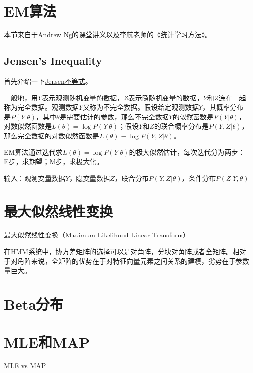 \section{EM算法}
\label{sec:em}
本节来自于Andrew Ng的课堂讲义以及李航老师的《统计学习方法》。

\subsection{Jensen's Inequality}
首先介绍一下\href{https://en.wikipedia.org/wiki/Jensen\%27s_inequality}{Jensen不等式}。



一般地，用$Y$表示观测随机变量的数据，$Z$表示隐随机变量的数据，$Y$和$Z$连在一起称为完全数据。观测数据$Y$又称为不完全数据。假设给定观测数据$Y$，其概率分布是$P(Y|\theta)$，其中$\theta$是需要估计的参数，那么不完全数据$Y$的似然函数是$P(Y|\theta)$，对数似然函数是$L(\theta)=\log P(Y|\theta)$；假设$Y$和$Z$的联合概率分布是$P(Y,Z|\theta)$，那么完全数据的对数似然函数是$L(\theta)=\log P(Y,Z|\theta)$。

EM算法通过迭代求$L(\theta)=\log P(Y|\theta)$的极大似然估计，每次迭代分为两步：E步，求期望；M步，求极大化。

输入：观测变量数据$Y$，隐变量数据$Z$，联合分布$P(Y,Z|\theta)$，条件分布$P(Z|Y,\theta)$

\section{最大似然线性变换}
最大似然线性变换（Maximum Likelihood Linear Transform）

在HMM系统中，协方差矩阵的选择可以是对角阵，分块对角阵或者全矩阵。相对于对角阵来说，全矩阵的优势在于对特征向量元素之间关系的建模，劣势在于参数量巨大。

\section{Beta分布}
  

\section{MLE和MAP}

\href{https://wiseodd.github.io/techblog/2017/01/01/mle-vs-map/}{MLE vs MAP}

